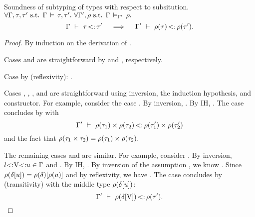 
\begin{theorem}{Soundness of subtyping of types with respect to subsitution.}%
\label{thm:subty-sound-subst}
    $\forall \AEnv, \ty, \ty' \text{ s.t. } \tyvlddflt{\ty, \ty'}.\ 
     \forall \AEnv', \substvars \text{ s.t. } \vldinenvdflt{\substvars}.$
     \[ 
        \Gamma\ \vdash\ \tau \operatorname{<:} \tau' \quad\implies\quad
        \Gamma'\ \vdash\ \rho(\tau) \operatorname{<:} \rho(\tau').
     \]
\end{theorem}
\begin{proof}
    By induction on the derivation of .

    Cases  and  are straightforward by  and
    \RST{Bot}, respectively. 

    Case  by  (reflexivity):
    \subty{\AEnv'}{\substvars(\vany)}{\substvars(\vany)}.

    Cases , , , and  are
    straightforward using inversion, the induction hypothesis, and constructor.
    For example, consider the case \RST{Tuple}
    .
    By inversion, .
    By IH, .
    The case concludes by \RST{Tuple} with 
    \[\Gamma'\ \vdash\ \rho(\tau_1) \times \rho(\tau_2) \operatorname{<:} \rho(\tau'_1) \times \rho(\tau'_2)\]
    and the fact that $\rho(\tau_1 \times \tau_2) = 
    \rho(\tau_1) \times \rho(\tau_2).$

    The remaining cases  and  are similar.
    For example, consider \RST{VarLeft} .
    By inversion, $l{\operatorname{<:}}\mathrm{V}{\operatorname{<:}}u \in \Gamma$ and
    \subtydflt{\plug\dctx{\tyub}}{\ty'}.
    By IH, .
    By inversion of the assumption \vldinenvdflt{\substvars}, we know
    \subty{\AEnv'}{\substvars(\vany)}{\substvars(\tyub)}.
    Since $\rho(\delta[u]) = 
    \rho(\delta)[\rho(u)]$ and
     by reflexivity,
    we have \subty{\AEnv'}{\plug{\substvars(\dctx)}{\substvars(\vany)}}
    {\plug{\substvars(\dctx)}{\substvars(\tyub)}}.
    The case concludes by  (transitivity) with the
    middle type $\rho(\delta[u])$:
    \[\Gamma'\ \vdash\ \rho(\delta[\mathrm{V}]) \operatorname{<:} \rho(\tau').\]
\end{proof}


